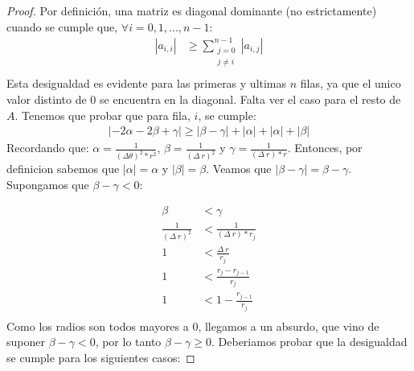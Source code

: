   \begin{proof}
    Por definición, una matriz es diagonal dominante (no estrictamente) cuando se cumple que, $\forall i = 0,1,...,n-1$:
    \begin{equation*}
        \begin{aligned}
          |a_{i,i}| &\geq \sum\limits_{\substack{j=0  \\ j \neq i}}^{n-1} |a_{i,j}| \\
        \end{aligned}
    \end{equation*}
    Esta desigualdad es evidente para las primeras  y ultimas $n$ filas, ya que el unico valor distinto de 0 se encuentra en la diagonal.
    Falta ver el caso para el resto de $A$. Tenemos que probar que para fila, $i$, se cumple:
    \begin{equation*}
        \begin{aligned}
          |-2\alpha-2\beta+\gamma| \geq |\beta - \gamma| + |\alpha| + |\alpha| + |\beta|
        \end{aligned}
    \end{equation*}
    \newline
    Recordando que: $\alpha = \frac{1}{(\Delta\theta)^2 * r^2}$, $\beta = \frac{1}{(\Delta\ r)^2}$ y $\gamma = \frac{1}{(\Delta\ r) * r}$.
    \newline
    \newline
    Entonces, por definicion sabemos que $|\alpha| = \alpha$ y $|\beta| = \beta$.
    \newline
    \newline
    Veamos que $|\beta - \gamma| = \beta - \gamma$. Supongamos que $\beta - \gamma < 0$:

    \begin{equation*}
        \begin{aligned}
          \beta &< \gamma \\
          \frac{1}{(\Delta\ r)^2}  &< \frac{1}{(\Delta\ r) * r_{j}} \\
          1 &< \frac{\Delta\ r}{r_{j}} \\
          1 &< \frac{r_{j} - r_{j-1}}{r_{j}} \\
          1 &< 1 - \frac{r_{j-1}}{r_{j}} \\
        \end{aligned}
    \end{equation*}
    Como los radios son todos mayores a 0, llegamos a un absurdo, que vino de suponer $\beta - \gamma < 0$, por lo tanto $\beta - \gamma \geq 0$.
    \newline
    \newline
    Deberiamos probar que la desigualdad se cumple para los siguientes casos:


\end{proof}
